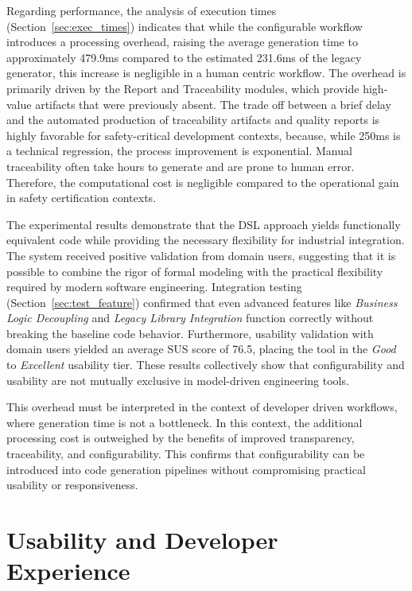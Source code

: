 Regarding performance, the analysis of execution times (Section~\ref{sec:exec_times}) indicates that while the configurable workflow introduces a processing overhead, raising the average generation time to approximately 479.9ms compared to the estimated 231.6ms of the legacy generator, this increase is negligible in a human centric workflow. The overhead is primarily driven by the Report and Traceability modules, which provide high-value artifacts that were previously absent. The trade off between a brief delay and the automated production of traceability artifacts and quality reports is highly favorable for safety-critical development contexts, because, while 250ms is a technical regression, the process improvement is exponential. Manual traceability often take hours to generate and are prone to human error. Therefore, the computational cost is negligible compared to the operational gain in safety certification contexts.

The experimental results demonstrate that the \gls{DSL} approach yields functionally equivalent code while providing the necessary flexibility for industrial integration. The system received positive validation from domain users, suggesting that it is possible to combine the rigor of formal modeling with the practical flexibility required by modern software engineering. Integration testing (Section~\ref{sec:test_feature}) confirmed that even advanced features like \textit{Business Logic Decoupling} and \textit{Legacy Library Integration} function correctly without breaking the baseline code behavior. Furthermore, usability validation with domain users yielded an average \gls{SUS} score of 76.5, placing the tool in the \textit{Good} to \textit{Excellent} usability tier. These results collectively show that configurability and usability are not mutually exclusive in model-driven engineering tools.

This overhead must be interpreted in the context of developer driven workflows, where generation time is not a bottleneck. In this context, the additional processing cost is outweighed by the benefits of improved transparency, traceability, and configurability. This confirms that configurability can be introduced into code generation pipelines without compromising practical usability or responsiveness.



\section{Usability and Developer Experience}
\label{sec:usability_and_dev_experience}

